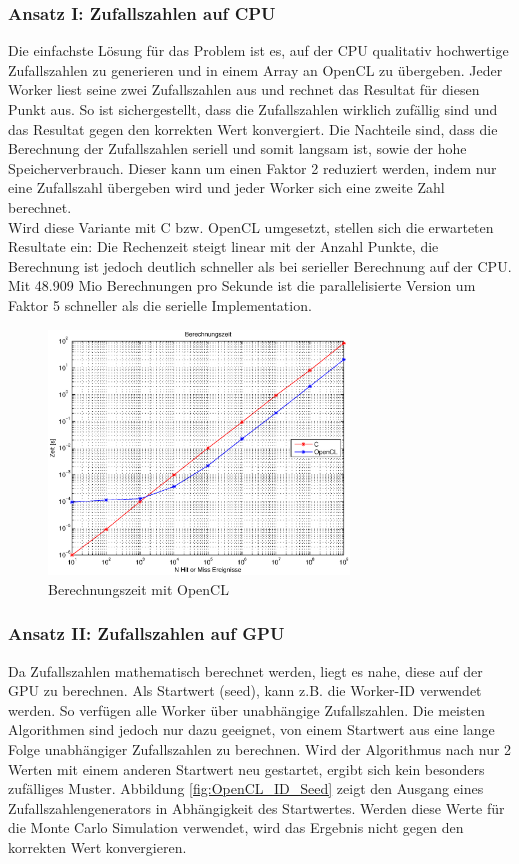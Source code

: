 \documentclass{book}
\begin{document}
\begin{refsection}
\subsubsection{Ansatz I: Zufallszahlen auf CPU}
Die einfachste Lösung für das Problem ist es, auf der CPU qualitativ hochwertige Zufallszahlen zu generieren und in einem Array an OpenCL zu übergeben. Jeder Worker liest seine zwei Zufallszahlen aus und rechnet das Resultat für diesen Punkt aus. So ist sichergestellt, dass die Zufallszahlen wirklich zufällig sind und das Resultat gegen den korrekten Wert konvergiert. Die Nachteile sind, dass die Berechnung der Zufallszahlen seriell und somit langsam ist, sowie der hohe Speicherverbrauch. Dieser kann um einen Faktor 2 reduziert werden, indem nur eine Zufallszahl übergeben wird und jeder Worker sich eine zweite Zahl berechnet. \\

Wird diese Variante mit C bzw. OpenCL umgesetzt, stellen sich die erwarteten Resultate ein: Die Rechenzeit steigt linear mit der Anzahl Punkte, die Berechnung ist jedoch deutlich schneller als bei serieller Berechnung auf der CPU. Mit 48.909 Mio Berechnungen pro Sekunde ist die parallelisierte Version um Faktor 5 schneller  als die serielle Implementation.

\begin{figure}[ht!]
	\centering
	\includegraphics[width=8cm]{images/Berechnungszeit_OpenCL.eps}
	\caption{Berechnungszeit mit OpenCL}
	\label{fig:OpenCL_Berechnungszeit}
\end{figure}


\subsubsection{Ansatz II: Zufallszahlen auf GPU}
Da Zufallszahlen mathematisch berechnet werden, liegt es nahe, diese auf der GPU zu berechnen. Als Startwert (seed), kann z.B. die Worker-ID verwendet werden. So verfügen alle Worker über unabhängige Zufallszahlen. Die meisten Algorithmen sind jedoch nur dazu geeignet, von einem Startwert aus eine lange Folge unabhängiger Zufallszahlen zu berechnen. Wird der Algorithmus nach nur 2 Werten mit einem anderen Startwert neu gestartet, ergibt sich kein besonders zufälliges Muster. Abbildung \ref{fig:OpenCL_ID_Seed} zeigt den Ausgang eines Zufallszahlengenerators in Abhängigkeit des Startwertes. Werden diese Werte für die Monte Carlo Simulation verwendet, wird das Ergebnis nicht gegen den korrekten Wert konvergieren. 


\end{refsection}
\end{document}
